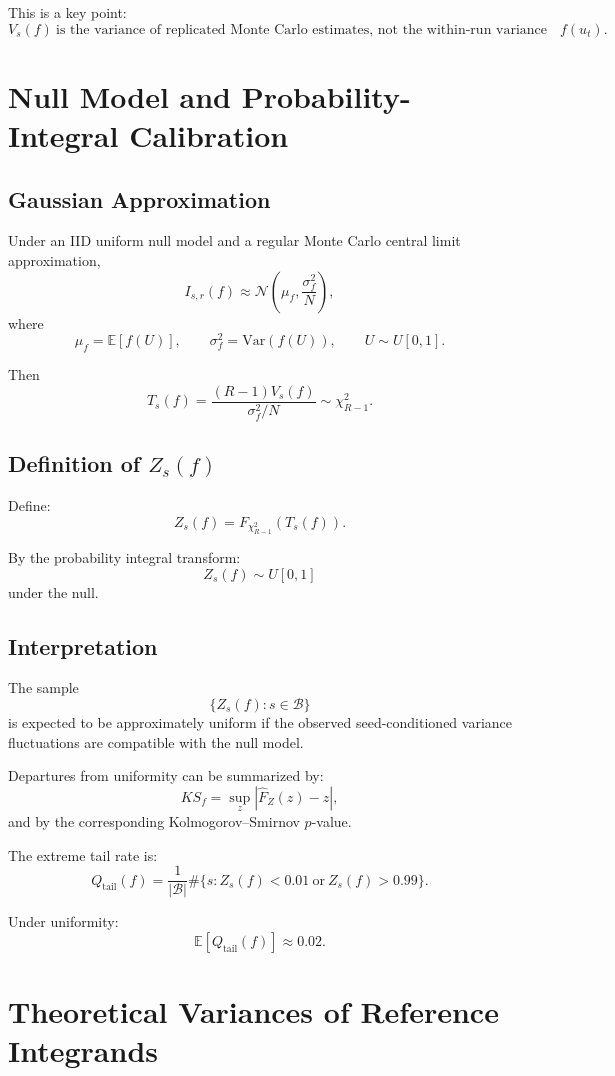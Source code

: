 \documentclass[11pt,a4paper]{article}
\newcommand{\E}{\mathbb E}
\newcommand{\Var}{\mathrm{Var}}
\newcommand{\qtail}{Q_{\mathrm{tail}}}
\begin{document}
This is a key point:
\[
\boxed{
V_s(f)\ \text{is the variance of replicated Monte Carlo estimates, not the within-run variance of }f(u_t).
}
\]

\section{Null Model and Probability-Integral Calibration}

\subsection{Gaussian Approximation}

Under an IID uniform null model and a regular Monte Carlo central limit approximation,
\[
I_{s,r}(f)
\approx
\mathcal N
\left(
\mu_f,\frac{\sigma_f^2}{N}
\right),
\]
where
\[
\mu_f=\E[f(U)],
\qquad
\sigma_f^2=\Var(f(U)),
\qquad
U\sim U[0,1].
\]

Then
\[
T_s(f)
=
\frac{(R-1)V_s(f)}
{\sigma_f^2/N}
\sim
\chi^2_{R-1}.
\]

\subsection{Definition of \(Z_s(f)\)}

Define:
\[
\boxed{
Z_s(f)
=
F_{\chi^2_{R-1}}
\left(
T_s(f)
\right).
}
\]

By the probability integral transform:
\[
\boxed{
Z_s(f)\sim U[0,1]
}
\]
under the null.

\subsection{Interpretation}

The sample
\[
\{Z_s(f):s\in\mathcal B\}
\]
is expected to be approximately uniform if the observed seed-conditioned variance fluctuations are compatible with the null model.

Departures from uniformity can be summarized by:
\[
KS_f
=
\sup_z
\left|
\hat F_Z(z)-z
\right|,
\]
and by the corresponding Kolmogorov--Smirnov \(p\)-value.

The extreme tail rate is:
\[
\boxed{
\qtail(f)
=
\frac1{|\mathcal B|}
\#\{s:Z_s(f)<0.01\ \text{or}\ Z_s(f)>0.99\}.
}
\]

Under uniformity:
\[
\E[\qtail(f)]\approx 0.02.
\]

\section{Theoretical Variances of Reference Integrands}
\end{document}
